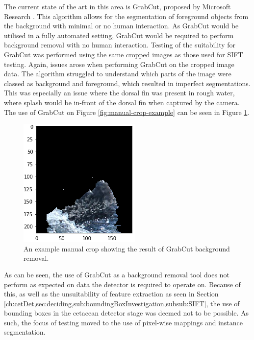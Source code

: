 The current state of the art in this area is GrabCut, proposed by Microsoft Research \cite{rother_grabcut_2004}. This algorithm allows for the segmentation of foreground objects from the background with minimal or no human interaction. As GrabCut would be utilised in a fully automated setting, GrabCut would be required to perform background removal with no human interaction. Testing of the suitability for GrabCut was performed using the same cropped images as those used for SIFT testing. Again, issues arose when performing GrabCut on the cropped image data. The algorithm struggled to understand which parts of the image were classed as background and foreground, which resulted in imperfect segmentations. This was especially an issue where the dorsal fin was present in rough water, where splash would be in-front of the dorsal fin when captured by the camera. The use of GrabCut on Figure \ref{fig:manual-crop-example} can be seen in Figure \ref{fig:grabcut-example}.

\begin{figure}
	\begin{center}
		\includegraphics[scale=0.6]{Chapter3/figs/grabcut-example.png}
	\end{center}
	\caption{An example manual crop showing the result of GrabCut background removal.
	}
	\label{fig:grabcut-example}
\end{figure}

As can be seen, the use of GrabCut as a background removal tool does not perform as expected on data the detector is required to operate on. Because of this, as well as the unsuitability of feature extraction as seen in Section \ref{ch:cetDet,sec:deciding,sub:boundingBoxInvestigation,subsub:SIFT}, the use of bounding boxes in the cetacean detector stage was deemed not to be possible. As such, the focus of testing moved to the use of pixel-wise mappings and instance segmentation.  


